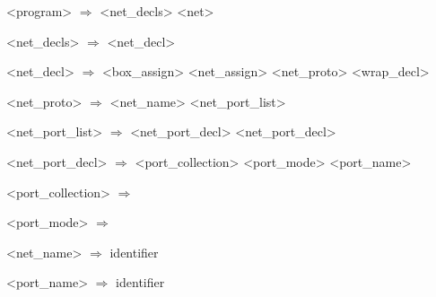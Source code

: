 \setlength{\grammarindent}{10em} %
\begin{grammar}
    <program> $\Rightarrow$ <net\_decls>  <net>

    <net\_decls> $\Rightarrow$ \Regex{[} <net\_decl> \Regex{]*}

    <net\_decl> $\Rightarrow$ <box\_assign>
    \alt <net\_assign>
    \alt <net\_proto>
    \alt <wrap\_decl>

    <net\_proto> $\Rightarrow$  <net\_name> \lit{(} <net\_port\_list> \lit{)}

    <net\_port\_list> $\Rightarrow$ <net\_port\_decl> \Regex{[} \lit{,} <net\_port\_decl> \Regex{]*}

    <net\_port\_decl> $\Rightarrow$ <port\_collection> <port\_mode> <port\_name>

    <port\_collection> $\Rightarrow$ 
    \alt {}
    \alt {}

    <port\_mode> $\Rightarrow$ 
    \alt {}

    <net\_name> $\Rightarrow$ identifier

    <port\_name> $\Rightarrow$ identifier
\end{grammar}

